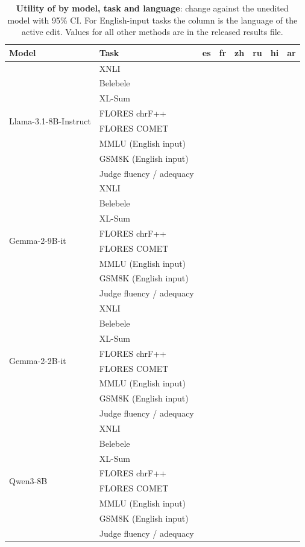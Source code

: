 \begin{table}[!htbp]
  \centering
  \footnotesize
  \setlength{\tabcolsep}{3pt}
  \begin{tabular}{@{}ll cccccc@{}}
    \toprule
    \textbf{Model} & \textbf{Task} & es & fr & zh & ru & hi & ar \\
    \midrule
    \multirow{8}{*}{Llama-3.1-8B-Instruct} & XNLI & & & & & & \\
     & Belebele & & & & & & \\
     & XL-Sum & & & & & & \\
     & FLORES chrF++ & & & & & & \\
     & FLORES COMET & & & & & & \\
     & MMLU (English input) & & & & & & \\
     & GSM8K (English input) & & & & & & \\
     & Judge fluency / adequacy & & & & & & \\
    \midrule
    \multirow{8}{*}{Gemma-2-9B-it} & XNLI & & & & & & \\
     & Belebele & & & & & & \\
     & XL-Sum & & & & & & \\
     & FLORES chrF++ & & & & & & \\
     & FLORES COMET & & & & & & \\
     & MMLU (English input) & & & & & & \\
     & GSM8K (English input) & & & & & & \\
     & Judge fluency / adequacy & & & & & & \\
    \midrule
    \multirow{8}{*}{Gemma-2-2B-it} & XNLI & & & & & & \\
     & Belebele & & & & & & \\
     & XL-Sum & & & & & & \\
     & FLORES chrF++ & & & & & & \\
     & FLORES COMET & & & & & & \\
     & MMLU (English input) & & & & & & \\
     & GSM8K (English input) & & & & & & \\
     & Judge fluency / adequacy & & & & & & \\
    \midrule
    \multirow{8}{*}{Qwen3-8B} & XNLI & & & & & & \\
     & Belebele & & & & & & \\
     & XL-Sum & & & & & & \\
     & FLORES chrF++ & & & & & & \\
     & FLORES COMET & & & & & & \\
     & MMLU (English input) & & & & & & \\
     & GSM8K (English input) & & & & & & \\
     & Judge fluency / adequacy & & & & & & \\
    \bottomrule
  \end{tabular}
  \caption{\textbf{Utility of \foxp by model, task and language}: change against the unedited model with 95\% CI. For English-input tasks the column is the language of the active edit. Values for all other methods are in the released results file.}
  \label{tab:app-utility}
\end{table}

